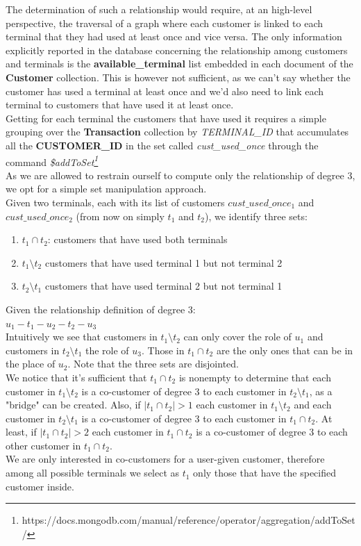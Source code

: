\documentclass[runningheads]{llncs}
\begin{document}
\hfill

The determination of such a relationship would require, at an high-level perspective, the traversal of a graph where each customer is linked to each terminal that they had used at least once and vice versa. The only information explicitly reported in the database concerning the relationship among customers and terminals is the \textbf{available\_terminal} list embedded in each document of the \textbf{Customer} collection. This is however not sufficient, as we can't say whether the customer has used a terminal at least once and we'd also need to link each terminal to customers that have used it at least once.
\\
Getting for each terminal the customers that have used it requires a simple grouping over the \textbf{Transaction} collection by \emph{TERMINAL\_ID} that accumulates all the \textbf{CUSTOMER\_ID} in the set called \emph{cust\_used\_once} through the command \emph{\$addToSet\footnote{https://docs.mongodb.com/manual/reference/operator/aggregation/addToSet/}}
\\
As we are allowed to restrain ourself to compute only the relationship of degree 3, we opt for a simple set manipulation approach.\\
Given two terminals, each with its list of customers $cust\_used\_once_1$ and $cust\_used\_once_2$ (from now on simply $t_1$ and $t_2$), we identify three sets:
\begin{enumerate}
    \item $t_1 \cap t_2$: customers that have used both terminals
    \item $t_1 \setminus t_2$ customers that have used terminal 1 but not terminal 2
    \item $t_2 \setminus t_1$ customers that have used terminal 2 but not terminal 1
\end{enumerate}
Given the relationship definition of degree 3: 
\\
$u_1-t_1-u_2-t_2-u_3$
\\
Intuitively we see that customers in $t_1 \setminus t_2$ can only cover the role of $u_1$ and customers in $t_2 \setminus t_1$ the role of $u_3$. Those in $t_1 \cap t_2$ are the only ones that can be in the place of $u_2$. Note that the three sets are disjointed.
\\
We notice that it's sufficient that $t_1 \cap t_2$ is nonempty to determine that each customer in $t_1 \setminus t_2$ is a co-customer of degree 3 to each customer in $t_2 \setminus t_1$, as a "bridge" can be created. Also, if $|t_1 \cap t_2| > 1$ each customer in $t_1 \setminus t_2$ and each customer in $t_2 \setminus t_1$ is a co-customer of degree 3 to each customer in $t_1 \cap t_2$. At least, if $|t_1 \cap t_2| > 2$ each customer in $t_1 \cap t_2$ is a co-customer of degree 3 to each other customer in $t_1 \cap t_2$.
\\
We are only interested in co-customers for a user-given customer, therefore among all possible terminals we select as $t_1$ only those that have the specified customer inside.
\end{document}
